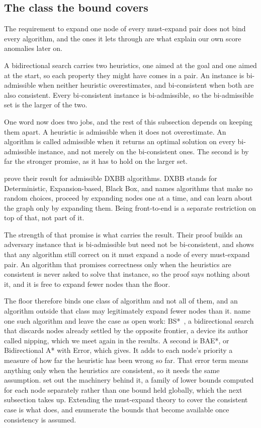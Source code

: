 \documentclass[letterpaper]{article} %
\begin{document}
\subsection{The class the bound covers}

The requirement to expand one node of every must-expand pair does not bind every algorithm, and the ones it lets through are what explain our own score anomalies later on.

A bidirectional search carries two heuristics, one aimed at the goal and one aimed at the start, so each property they might have comes in a pair. An instance is bi-admissible when neither heuristic overestimates, and bi-consistent when both are also consistent. Every bi-consistent instance is bi-admissible, so the bi-admissible set is the larger of the two.

One word now does two jobs, and the rest of this subsection depends on keeping them apart. A heuristic is admissible when it does not overestimate. An algorithm is called admissible when it returns an optimal solution on every bi-admissible instance, and not merely on the bi-consistent ones. The second is by far the stronger promise, as it has to hold on the larger set.

\citet{eckerle2017sufficient} prove their result for admissible DXBB algorithms. DXBB stands for Deterministic, Expansion-based, Black Box, and names algorithms that make no random choices, proceed by expanding nodes one at a time, and can learn about the graph only by expanding them. Being front-to-end is a separate restriction on top of that, not part of it.

The strength of that promise is what carries the result. Their proof builds an adversary instance that is bi-admissible but need not be bi-consistent, and shows that any algorithm still correct on it must expand a node of every must-expand pair. An algorithm that promises correctness only when the heuristics are consistent is never asked to solve that instance, so the proof says nothing about it, and it is free to expand fewer nodes than the floor.

The floor therefore binds one class of algorithm and not all of them, and an algorithm outside that class may legitimately expand fewer nodes than it. \citet{eckerle2017sufficient} name one such algorithm and leave the case as open work: BS*~\cite{kwa1989bs}, a bidirectional search that discards nodes already settled by the opposite frontier, a device its author called nipping, which we meet again in the results. A second is BAE*, or Bidirectional A* with Error, which \citet{sadhukhan2013bae} gives. It adds to each node's priority a measure of how far the heuristic has been wrong so far. That error term means anything only when the heuristics are consistent, so it needs the same assumption. \citet{alcazar2020unifying} set out the machinery behind it, a family of lower bounds computed for each node separately rather than one bound held globally, which the next subsection takes up. Extending the must-expand theory to cover the consistent case is what \citet{alcazar2021consistent} does, and \citet{siag2023frontToEnd} enumerate the bounds that become available once consistency is assumed.
\end{document}
